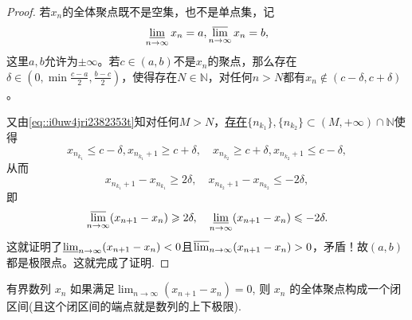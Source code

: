 \documentclass[../../main.tex]{subfiles}%
\begin{document}
\begin{proof}

若\( x_n \)的全体聚点既不是空集，也不是单点集，记
\begin{align}
\varliminf_{n \to \infty} x_n = a, \varlimsup_{n \to \infty} x_n = b, \label{eq::i0uw4jri2382353t}
\end{align}
这里\( a,b \)允许为\( \pm \infty \)。若\( c \in (a,b) \)不是\( x_n \)的聚点，那么存在\( \delta \in (0,\min{\frac{c-a}{2},\frac{b-c}{2}}) \)，使得存在\( N \in \mathbb{N} \)，对任何\( n > N \)都有\( x_n \notin (c - \delta, c + \delta) \)。

又由\eqref{eq::i0uw4jri2382353t}知对任何\( M > N \)，\hyperlink{n1n2子列存在的原因}{存在\( \{n_{k_1}\}, \{n_{k_2}\} \subset (M,+\infty)\cap \mathbb{N} \)}使得
\[
x_{n_{k_1}} \leqslant c - \delta, x_{n_{k_1} + 1} \geqslant c + \delta,\quad x_{n_{k_2}} \geqslant c + \delta, x_{n_{k_2} + 1} \leqslant c - \delta,
\]
从而
\[
x_{n_{k_1} + 1} - x_{n_{k_1}} \geqslant 2\delta,\quad  x_{n_{k_2} + 1} - x_{n_{k_2}} \leqslant -2\delta,
\]
即
\[
\varlimsup_{n \to \infty} (x_{n+1} - x_n) \geqslant 2\delta, \quad  \varliminf_{n \to \infty} (x_{n+1} - x_n) \leqslant -2\delta.
\]
这就证明了\( \varliminf_{n \to \infty} (x_{n+1} - x_n) < 0 \)且\( \varlimsup_{n \to \infty} (x_{n+1} - x_n) > 0 \)，矛盾！故\( (a,b) \)都是极限点。这就完成了证明.

\end{proof}

\begin{corollary}\label{corollary:有界数列差分极限为0则其闭包一定是闭区间}
有界数列 \( x_n \) 如果满足$\lim_{n \to \infty} (x_{n+1} - x_n) = 0$,
则 \( x_n \) 的全体聚点构成一个闭区间(且这个闭区间的端点就是数列的上下极限).
\end{corollary}
\end{document}
